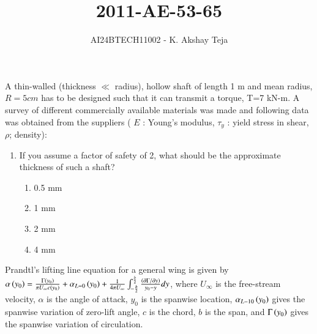 \documentclass[journal,9pt,onecolumn]{IEEEtran}
\begin{document}

\vspace{3cm}
\title{2011-AE-53-65}
\author{AI24BTECH11002 - K. Akshay Teja}
\maketitle
 \bigskip
{\let\newpage\relax\maketitle}

\renewcommand{\thefigure}{\theenumi}
\renewcommand{\thetable}{\theenumi}
\setlength{\intextsep}{10pt} %

\renewcommand{\thetable}{\theenumi}


\noindent
A thin-walled (thickness $\ll$ radius), hollow shaft of length 1 m and mean radius, $R=5 cm$ has to be designed such that it can transmit a torque, T=7 kN-m. A survey of different commercially available materials was made and following data was obtained from the suppliers ( $E$ : Young's modulus, $\tau_y$ : yield stress in shear, $\rho$; density):\\
\begin{table}[h!]
    \centering
    
    \label{AE-2011}
\end{table}
\begin{enumerate}
\item If you assume a factor of safety of 2, what should be the approximate thickness of such a shaft?
   \begin{multicols}{4}
   \begin{enumerate}
       \item 0.5 mm
       \item 1 mm
       \item 2 mm
       \item 4 mm
   \end{enumerate}
   \end{multicols}
\end{enumerate} 
\noindent
Prandtl's lifting line equation for a general wing is given by \\
$\alpha\left(y_0\right)=\frac{\Gamma\left(y_0\right)}{\pi U_{\infty} c\left(y_0\right)}+\alpha_{L=0}\left(y_0\right)+\frac{1}{4 \pi U_{\infty}} \int_{-\frac{b}{2}}^{\frac{b}{2}} \frac{\left(\partial \Gamma / \partial y\right)}{y_0-y} d y$, 
where $U_{\infty}$ is the free-stream velocity, $\alpha$ is the angle of attack, $y_0$ is the spanwise location, $\alpha_{L-10}\left(y_0\right)$ gives the spanwise variation of zero-lift angle, $c$ is the chord, $b$ is the span, and $\Gamma\left(y_0\right)$ gives the spanwise variation of circulation.
\end{document}
